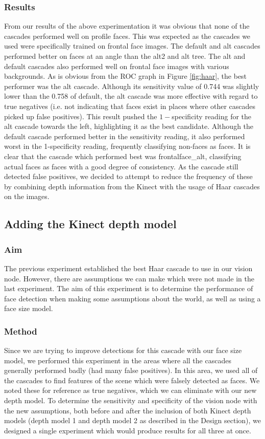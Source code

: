\documentclass[conference]{IEEEtran}
\begin{document}
\subsubsection{Results}
From our results of the above experimentation it was obvious that none of the cascades performed well on profile faces. This was expected as the cascades we used were specifically trained on frontal face images. The default and alt cascades performed better on faces at an angle than the alt2 and alt tree. The alt and default cascades also performed well on frontal face images with various backgrounds. As is obvious from the ROC graph in Figure \ref{fig:haar}, the best performer was the alt cascade. Although its sensitivity value of 0.744 was slightly  lower than the 0.758 of default, the alt cascade was more effective with regard to true negatives (i.e. not indicating that faces exist in places where other cascades picked up false positives). This result pushed the $1-$specificity reading for the alt cascade towards the left, highlighting it as the best candidate. Although the default cascade performed better in the sensitivity reading, it also performed worst in the 1-specificity reading, frequently classifying non-faces as faces. It is clear that the cascade which performed best was frontalface\_alt, classifying actual faces as faces with a good degree of consistency. As the cascade still detected false positives, we decided to attempt to reduce the frequency of these by combining depth information from the Kinect with the usage of Haar cascades on the images.
\subsection{Adding the Kinect depth model}
\subsubsection{Aim}
The previous experiment established the best Haar cascade to use in our vision node. However, there are assumptions we can make which were not made in the last experiment. The aim of this experiment is to determine the performance of face detection when making some assumptions about the world, as well as using a face size model.
\subsubsection{Method}
Since we are trying to improve detections for this cascade with our face size model, we performed this experiment in the areas where all the cascades generally performed badly (had many false positives). In this area, we used all of the cascades to find features of the scene which were falsely detected as faces. We noted these for reference as true negatives, which we can eliminate with our new depth model. To determine the sensitivity and specificity of the vision node with the new assumptions, both before and after the inclusion of both Kinect depth models (depth model 1 and depth model 2 as described in the Design section), we designed a single experiment which would produce results for all three at once.
\end{document}

